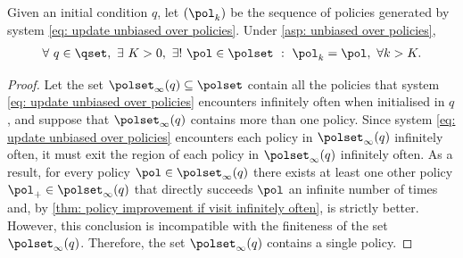 \begin{lemma}
\label{thm: all qpol in Pinf are equivalent}
    Given an initial condition $q$, let $(\pol_k)$ be the sequence of policies generated by system \eqref{eq: update unbiased over policies}.
Under \autoref{asp: unbiased over policies},
\begin{align}
    \forall \ q \in \qset, \
    \exists \ K > 0, \
    \exists ! \ \pol \in \polset
    \ : \
    \pol_k = \pol, \ \forall k > K .
\end{align}
\end{lemma}
\begin{proof}

\newcommand{\Pinf}{\polset_\infty(q)}

Let the set $\Pinf \subseteq \polset$ contain all the policies that system \eqref{eq: update unbiased over policies} encounters infinitely often when initialised in $q$, and suppose that $\Pinf$ contains more than one policy.
Since system \eqref{eq: update unbiased over policies} encounters each policy in $\Pinf$ infinitely often,
it must exit the region of each policy in $\Pinf$ infinitely often.
As a result, for every policy $\pol \in \Pinf$
there exists at least one other policy $\pol_+ \in \Pinf$ that directly succeeds $\pol$ an infinite number of times
and, by \autoref{thm: policy improvement if visit infinitely often}, is strictly better.
However, this conclusion is incompatible with the finiteness of the set $\Pinf$. 
Therefore, the set $\Pinf$ contains a single policy.
\end{proof}